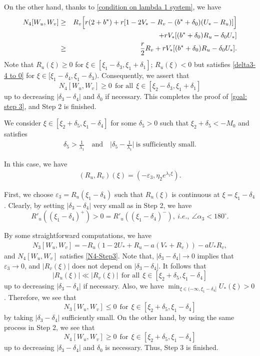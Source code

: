 \documentclass[11pt,a4paper]{article}
\numberwithin{equation}{section}
\numberwithin{figure}{section}
\newcommand\bea{\begin{eqnarray}}
\newcommand\eea{\end{eqnarray}}
\newcommand\beaa{\begin{eqnarray*}}
\newcommand\eeaa{\end{eqnarray*}}
\begin{document}
On the other hand, thanks to \eqref{condition on lambda 1 system}, we have
\bea\label{N4-Step3}
N_4[W_u,W_v]&\geq&R_v\Big[r(2+b^*)+r[1-2V_*-R_v-(b^*+\delta_0)(U_*-R_u)]\Big]
            \\&&+rV_*[(b^*+\delta_0)R_u-\delta_0U_*]\notag\\
           &\geq&  \frac{r}{2}R_v+rV_*[(b^*+\delta_0)R_u-\delta_0U_*].\notag
\eea
Note that $R_u(\xi)\geq0$ for $\xi\in[\xi_1-\delta_3,\xi_1+\delta_1]$; $R_u(\xi)<0$ but satisfies \eqref{delta3-4 to 0} for $\xi\in[\xi_1-\delta_4,\xi_1-\delta_3)$.
Consequently, we assert that
$$N_4[W_u,W_v]\ge 0\ \ \text{for all}\ \ \xi\in[\xi_2-\delta_3,\xi_1+\delta_1]$$
 up to decreasing $|\delta_3-\delta_4|$ and $\delta_0$ if necessary.
This completes the proof of \eqref{goal: step 3}, and Step 2 is finished.

\medskip



 We consider $\xi\in[\xi_2+\delta_5,\xi_1-\delta_4]$ for some $\delta_5>0$ such that $\xi_2+\delta_5<-M_0$ and satisfies
\bea\label{cond delta 5}
\delta_5>\frac{1}{\lambda_1}\quad\text{and}\quad \Big|\delta_5-\frac{1}{\lambda_1}\Big|\ \text{is sufficiently small}.
\eea

In this case, we have
\beaa
(R_u,R_v)(\xi)=(-\varepsilon_3,\eta_2e^{\lambda_1\xi}).
\eeaa

First, we choose $\varepsilon_3=R_u(\xi_1-\delta_4)$ such that $R_u(\xi)$ is continuous at $\xi=\xi_1-\delta_4$.
Clearly, by setting $|\delta_3-\delta_4|$ very small as in Step 2, we have 
$$R'_u((\xi_1-\delta_{4})^+)>0=R'_u((\xi_1-\delta_{4})^-),\  i.e.,\  \angle\alpha_3<180^{\circ}.$$


By some straightforward computations, we have
\beaa
N_3[W_u,W_v]=-R_u(1-2U_*+R_u-a(V_*+R_v))-aU_*R_v,
\eeaa
and $N_4[W_u,W_v]$ satisfies \eqref{N4-Step3}.
Note that, $|\delta_3-\delta_4|\to0$ implies that $\varepsilon_3\to 0$, and $|R_v(\xi)|$
does not depend on $|\delta_3-\delta_4|$.
It follows that 
$$|R_u(\xi)|\ll |R_v(\xi)|\ \ \text{for all}\ \ \xi\in[\xi_2+\delta_5,\xi_1-\delta_4]$$
up to decreasing $|\delta_3-\delta_4|$ if necessary. Also, we have $\min_{\xi\in(-\infty,\xi_1-\delta_4]}U_*(\xi)>0$. Therefore,
we see that 
$$N_3[W_u,W_v]\leq 0\ \ \text{for}\ \ \xi\in[\xi_2+\delta_5,\xi_1-\delta_4]$$
by taking $|\delta_3-\delta_4|$ sufficiently small.
On the other hand, by using the same process in Step 2, we see that 
$$N_4[W_u, W_v]\geq 0\ \ \text{for}\ \ \xi\in[\xi_2+\delta_5,\xi_1-\delta_4]$$
up to decreasing $|\delta_3-\delta_4|$ and $\delta_0$ is necessary. Thus, Step 3 is finished.
\end{document}
